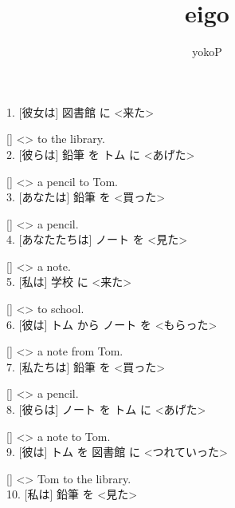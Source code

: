 \documentclass[uplatex,
paper=a4,
fontsize=18pt,
jafontsize=16pt,
number_of_lines=30,
line_length=30zh,
baselineskip=25pt,
]{jlreq}
\author{yokoP}
\title{eigo}
\begin{document}
1.  [彼女は] 図書館 に <来た>

  [\hspace{3em}] <\hspace{3em}> to the library.
\\

2.  [彼らは] 鉛筆 を トム に <あげた>

  [\hspace{3em}] <\hspace{3em}> a pencil to Tom.
\\

3.  [あなたは] 鉛筆 を <買った>

  [\hspace{3em}] <\hspace{3em}> a pencil.
\\

4.  [あなたたちは] ノート を <見た>

  [\hspace{3em}] <\hspace{3em}> a note.
\\

5.  [私は] 学校 に <来た>

  [\hspace{3em}] <\hspace{3em}> to school.
\\

6.  [彼は] トム から ノート を <もらった>

  [\hspace{3em}] <\hspace{3em}> a note from Tom.
\\

7.  [私たちは] 鉛筆 を <買った>

  [\hspace{3em}] <\hspace{3em}> a pencil.
\\

8.  [彼らは] ノート を トム に <あげた>

  [\hspace{3em}] <\hspace{3em}> a note to Tom.
\\

9.  [彼は] トム を 図書館 に <つれていった>

  [\hspace{3em}] <\hspace{3em}> Tom to the library.
\\

10.  [私は] 鉛筆 を <見た>
\end{document}
